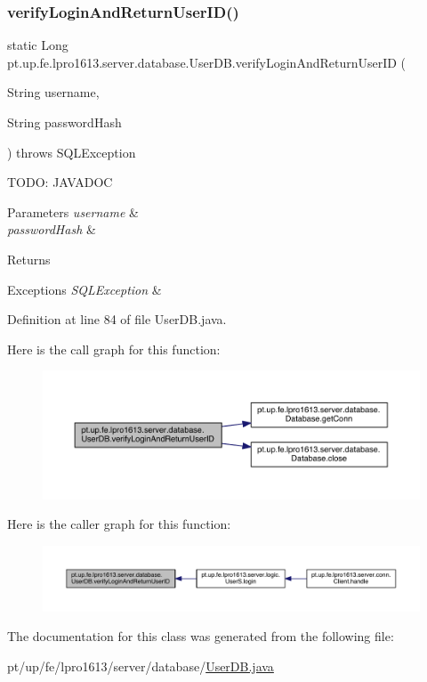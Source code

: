 \subsubsection{\texorpdfstring{verify\+Login\+And\+Return\+User\+I\+D()}{verifyLoginAndReturnUserID()}}
{\footnotesize\ttfamily static Long pt.\+up.\+fe.\+lpro1613.\+server.\+database.\+User\+D\+B.\+verify\+Login\+And\+Return\+User\+ID (\begin{DoxyParamCaption}\item[{String}]{username,  }\item[{String}]{password\+Hash }\end{DoxyParamCaption}) throws S\+Q\+L\+Exception\hspace{0.3cm}{\ttfamily [static]}}

T\+O\+DO\+: J\+A\+V\+A\+D\+OC 
\begin{DoxyParams}{Parameters}
{\em username} & \\
\hline
{\em password\+Hash} & \\
\hline
\end{DoxyParams}
\begin{DoxyReturn}{Returns}

\end{DoxyReturn}

\begin{DoxyExceptions}{Exceptions}
{\em S\+Q\+L\+Exception} & \\
\hline
\end{DoxyExceptions}


Definition at line 84 of file User\+D\+B.\+java.

Here is the call graph for this function\+:
\nopagebreak
\begin{figure}[H]
\begin{center}
\leavevmode
\includegraphics[width=350pt]{classpt_1_1up_1_1fe_1_1lpro1613_1_1server_1_1database_1_1_user_d_b_ac3083ed924599ce2b694ce622676bca6_cgraph}
\end{center}
\end{figure}
Here is the caller graph for this function\+:
\nopagebreak
\begin{figure}[H]
\begin{center}
\leavevmode
\includegraphics[width=350pt]{classpt_1_1up_1_1fe_1_1lpro1613_1_1server_1_1database_1_1_user_d_b_ac3083ed924599ce2b694ce622676bca6_icgraph}
\end{center}
\end{figure}


The documentation for this class was generated from the following file\+:\begin{DoxyCompactItemize}
\item 
pt/up/fe/lpro1613/server/database/\hyperlink{_user_d_b_8java}{User\+D\+B.\+java}\end{DoxyCompactItemize}
